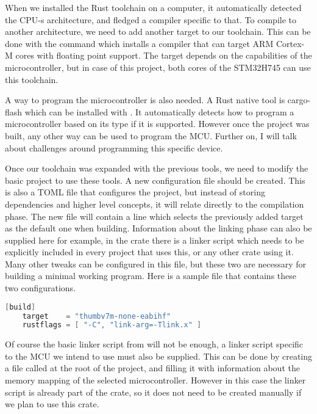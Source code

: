 When we installed the Rust toolchain on a computer, it automatically detected the CPU-s architecture, and fledged a compiler specific to that. To compile to another architecture, we need to add another target to our toolchain. This can be done with the command  which installs a compiler that can target ARM Cortex-M cores with floating point support. The target depends on the capabilities of the microcontroller, but in case of this project, both cores of the STM32H745 can use this toolchain.

A way to program the microcontroller is also needed. A Rust native tool is cargo-flash which can be installed with . It automatically detects how to program a microcontroller based on its type if it is supported. However once the project was built, any other way can be used to program the MCU. Further on, I will talk about challenges around programming this specific device.

Once our toolchain was expanded with the previous tools, we need to modify the basic project to use these tools. A new configuration file  should be created. This is also a TOML file that configures the project, but instead of storing dependencies and higher level concepts, it will relate directly to the compilation phase. The new file will contain a line which selects the previously added target as the default one when building. Information about the linking phase can also be supplied here for example, in the  crate there is a linker script  which needs to be explicitly included in every project that uses this, or any other crate using it. Many other tweaks can be configured in this file, but these two are necessary for building a minimal working program. Here is a sample file that contains these two configurations.

\begin{lstlisting}[language=C,frame=single,float=!ht,label={lst:cargo-config-file},caption={Cargo Config File}]
    [build]
    target    = "thumbv7m-none-eabihf"
    rustflags = [ "-C", "link-arg=-Tlink.x" ]
\end{lstlisting}

Of course the basic linker script from will not be enough, a linker script specific to the MCU we intend to use must also be supplied. This can be done by creating a file called  at the root of the project, and filling it with information about the memory mapping of the selected microcontroller. However in this case the linker script is already part of the  crate, so it does not need to be created manually if we plan to use this crate.

